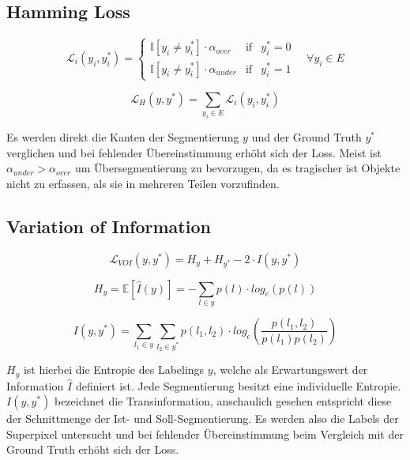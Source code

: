 \subsection{Hamming Loss}

\begin{equation}
\mathcal{L}_i(y_i, y_i^*) = \left\{ \begin{array}{lcc}  
\mathbb{I}[y_i \neq y_i^*] \cdot \alpha_{over} & \text{if} & y_i^* = 0  \\ 
\mathbb{I}[y_i \neq y_i^*] \cdot \alpha_{under} & \text{if} & y_i^* = 1         
\end{array}  \right.  \quad \forall y_i \in E 
\end{equation}

\begin{equation}
\mathcal{L}_H(y, y^*) = \sum\limits_{y_i \in E} \mathcal{L}_i(y_i, y_i^*)
\end{equation}


Es werden direkt die Kanten der Segmentierung $y$ und der Ground Truth $y^*$ verglichen und bei fehlender Übereinstimmung erhöht sich der Loss. Meist ist $\alpha_{under} > \alpha_{over}$ um Übersegmentierung zu bevorzugen, da es tragischer ist Objekte nicht zu erfassen, als sie in mehreren Teilen vorzufinden. 

\subsection{Variation of Information}\label{sec:voi}

\begin{equation}
\mathcal{L}_{VOI}(y, y^*) = H_y + H_{y^*} - 2 \cdot I(y, y^*)
\end{equation}

\begin{equation}
H_y = \mathbb{E}[\hat{I}(y)] = - \sum\limits_{l \in y} p(l) \cdot log_e( p(l) )
\end{equation}

\begin{equation}
I(y, y^*) = \sum\limits_{l_1 \in y} \sum\limits_{l_2 \in y^*} p(l_1, l_2) \cdot log_e \left( \frac{p(l_1, l_2)}{p(l_1) p(l_2)} \right)
\end{equation}

$H_y$ ist hierbei die Entropie des Labelings $y$, welche als Erwartungswert der Information $\hat{I}$  definiert ist. Jede Segmentierung besitzt eine individuelle Entropie.  \\
$I(y, y^*)$ bezeichnet die Transinformation, anschaulich gesehen entspricht diese der Schnittmenge der Ist- und Soll-Segmentierung. 
Es werden also die Labels der Superpixel untersucht und bei fehlender Übereinstimmung beim Vergleich mit der Ground Truth erhöht sich der Loss.

